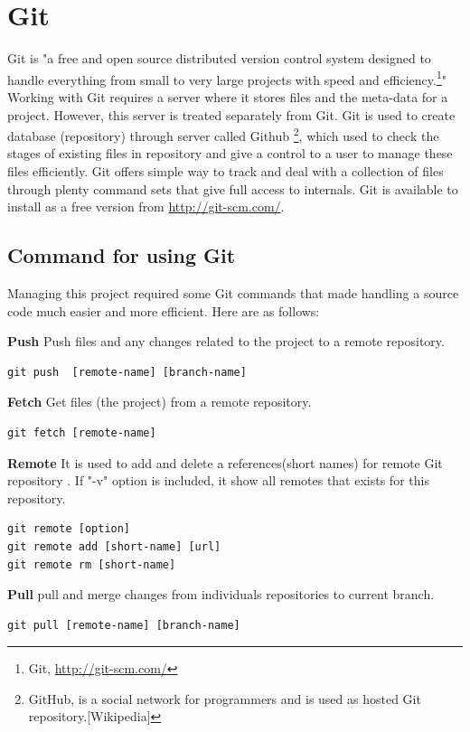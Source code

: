 \documentclass[11pt]{report}
\begin{document}
\section{Git}
\label{sec: Git}
Git is "a free and open source distributed version control system designed to handle everything from small to very large projects with speed and efficiency.\footnote{Git, \url{http://git-scm.com/}}"  Working with Git requires a server where it stores files and the meta-data for a project. However, this server is treated separately from Git.  Git is used to create database (repository) through server called Github \footnote{GitHub, is a social network for programmers and is used as hosted Git repository.[Wikipedia]}, which used to check the stages of existing files in repository and give a control to a user to manage these files efficiently. Git offers simple way to track and deal with a collection of files through plenty command sets that give full access to internals. Git is available to install as a free version from  \url{http://git-scm.com/}.


\subsection{Command for using Git}
\label{subsec: Command for using Git}
Managing this project required some Git commands that made handling a source code much easier and more efficient. Here are as follows:

\textbf{Push} Push files and any changes related to the project  to a remote repository.
\begin{verbatim}
git push  [remote-name] [branch-name]
\end{verbatim}

\textbf{Fetch} Get files (the project) from a remote repository.
\begin{verbatim}
git fetch [remote-name]
\end{verbatim}

\textbf{Remote} It is used to add and delete a  references(short names) for remote Git repository . If "-v" option is included, it show all remotes that exists for this repository.
\begin{verbatim}
git remote [option]
git remote add [short-name] [url]
git remote rm [short-name]
\end{verbatim}

\textbf{Pull} pull and merge changes from individuals repositories to current branch.
\begin{verbatim}
git pull [remote-name] [branch-name]
\end{verbatim}
\end{document}
